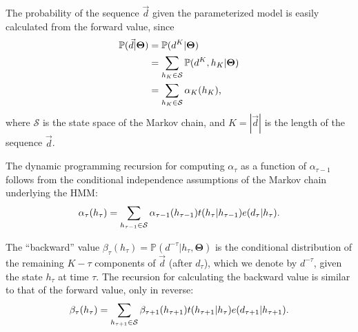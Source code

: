 \documentclass[preprint,12pt,authoryear]{elsarticle}
\newcommand{\Parameters}{\ensuremath{\bm{\Theta}}}
\newcommand{\datum}{\ensuremath{d}}
\newcommand{\hiddenState}{\ensuremath{h}}
\newcommand{\Time}{\ensuremath{\tau}}
\newcommand{\maxTime}{\ensuremath{K}}
\newcommand{\States}{\ensuremath{\mathcal{S}}}
\newcommand{\HMMtransitionLaw}{\ensuremath{t}}
\newcommand{\HMMemissionLaw}{\ensuremath{e}}
\newcommand{\forward}{\ensuremath{\alpha}}
\newcommand{\backward}{\ensuremath{\beta}}
\newcommand{\Prob}{\ensuremath{\mathbb P}}
\begin{document}
The probability of the sequence $\vec{\datum}$ given the parameterized model is easily calculated from the forward value, since
\begin{equation}\label{cbw_eq:ForwardLikelihood}
\begin{split}
\Prob( \vec{\datum} | \Parameters )
 & = \Prob( \datum^{\maxTime} | \Parameters ) \\
 & = \sum_{\hiddenState_{\maxTime} \in \States}{ \Prob( \datum^{\maxTime}, \hiddenState_{\maxTime} | \Parameters ) } \\
 & = \sum_{\hiddenState_{\maxTime} \in \States}{ \forward_{\maxTime}( \hiddenState_{\maxTime} ) } \hbox{,}
\end{split}
\end{equation}
where $\States$ is the state space of the Markov chain, and $\maxTime = |\vec{\datum}|$ is the length of the sequence $\vec{\datum}$.

The dynamic programming recursion for computing $\forward_{\Time}$ as a function of $\forward_{\Time - 1}$ follows from the conditional independence assumptions of the Markov chain underlying the HMM:
\begin{equation}\label{cbw_eq:forwardByTime}
\forward_{\Time}( \hiddenState_{\Time} )
 = \sum_{\hiddenState_{\Time - 1} \in \States}{ \forward_{\Time - 1}( \hiddenState_{\Time - 1 } ) \HMMtransitionLaw( \hiddenState_{\Time} | \hiddenState_{\Time - 1} ) \HMMemissionLaw( \datum_{\Time} | \hiddenState_{\Time} ) } \hbox{.}
\end{equation}

The ``backward'' value $\backward_{\Time}( \hiddenState_{\Time} ) = \Prob( \datum^{-\Time} | \hiddenState_{\Time}, \Parameters )$ is the conditional distribution of the remaining $\maxTime - \Time$ components of $\vec{\datum}$ (after $\datum_{\Time}$), which we denote by $\datum^{-\Time}$, given the state $\hiddenState_{\Time}$ at time $\Time$.  The recursion for calculating the backward value is similar to that of the forward value, only in reverse:
\begin{equation}\label{cbw_eq:backwardByTime}
\backward_{\Time}( \hiddenState_{\Time} )
 = \sum_{\hiddenState_{\Time + 1} \in \States}{ \backward_{\Time + 1}( \hiddenState_{\Time + 1 } ) \HMMtransitionLaw( \hiddenState_{\Time + 1} | \hiddenState_{\Time} ) \HMMemissionLaw( \datum_{\Time + 1} | \hiddenState_{\Time + 1} ) } \hbox{.}
\end{equation}
\end{document}
